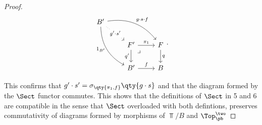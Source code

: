 \documentclass[../../main]{subfiles}
\begin{document}
\begin{exercise}
\begin{enumerate}[(i),resume]
\begin{proof}
				$$ \begin{tikzcd}
					B'
					\arrow[drr, bend left, "g \cdot s \cdot f"]
					\arrow[ddr, bend right, "1_{B'}" {left}]
					\arrow[dr, dotted, "g' \cdot s'" description] & & \\
																  & F' \arrow[r, "\pi_{1}"] \arrow[d, "q'"{left}] \arrow[dr, phantom, "\lrcorner", very near start]
																  & F\arrow[d, "q"] \\
																  & B' \arrow[r,"f"]
																  & B
				\end{tikzcd} .$$

				This confirms that $g' \cdot s' = \sigma_{\qty{\pi_{1},f}}\qty{g
				\cdot s}$ and that the diagram formed by the $\Sect$ functor
				commutes. This shows that the definitions of $\Sect$ in 5 and 6
				are compatible in the sense that $\Sect$ overloaded with both
				defintions, preserves commutativity of diagrams formed by
				morphisms of $\Top /B$  and \(\Top^\two_\pb\)
			\end{proof}
	\end{enumerate}
\end{exercise}
\end{document}
